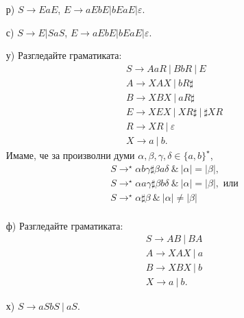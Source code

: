 \begin{hint}
  \begin{enumerate}
  \item[р)]
    $S\to EaE$, $E \to aEbE | bEaE | \varepsilon$.
  \item[с)]
    $S\to E | SaS$, $E \to aEbE | bEaE | \varepsilon$.
  \item[у)]
    Разгледайте граматиката:
    \begin{align*}
      & S \to AaR\ |\ BbR\ |\ E\\
      & A \to XAX\ |\ bR\sharp\\
      & B \to XBX\ |\ aR\sharp\\
      & E \to XEX\ |\ XR\sharp\ |\ \sharp XR\\
      & R \to XR\ |\ \varepsilon\\
      & X \to a\ |\ b.
    \end{align*}
    Имаме, че за произволни думи $\alpha,\beta,\gamma,\delta \in \{a,b\}^\star$,
    \begin{align*}
      & S \to^\star \alpha b \gamma \sharp \beta a \delta\ \&\ |\alpha| = |\beta|,\\
      & S \to^\star \alpha a \gamma \sharp \beta b \delta\ \&\ |\alpha| = |\beta|, \text{ или}\\
      & S \to^\star \alpha \sharp \beta\ \&\ |\alpha| \neq |\beta|\\
    \end{align*}
  \item[ф)]
    Разгледайте граматиката:
    \begin{align*}
      & S \to AB\ |\ BA\\
      & A \to XAX\ |\ a\\
      & B \to XBX\ |\ b\\
      & X \to a\ |\ b.
    \end{align*}
    
  \item[х)]
    $S \to aSbS\ |\ aS$.
  \end{enumerate}
\end{hint}

